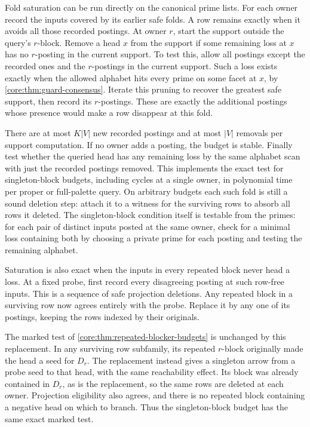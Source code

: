 Fold saturation can be run directly on the canonical
prime lists. For each owner record the inputs covered
by its earlier safe folds. A row remains exactly when
it avoids all those recorded postings. At owner $r$,
start the support outside the query's $r$-block.
Remove a head $x$ from the support if some remaining
loss at $x$ has no $r$-posting in the current support.
To test this, allow all postings except the recorded
ones and the $r$-postings in the current support.
Such a loss exists exactly when the allowed alphabet
hits every prime on some facet at $x$, by
\cref{core:thm:guard-consensus}. Iterate this pruning
to recover the greatest safe support, then record its
$r$-postings. These are exactly the additional postings
whose presence would make a row disappear at this fold.

There are at most $K|V|$ new recorded postings and
at most $|V|$ removals per support computation.
If no owner adds a posting, the budget is stable.
Finally test whether the queried head has any
remaining loss by the same alphabet scan with just
the recorded postings removed. This implements the
exact test for singleton-block budgets, including
cycles at a single owner, in polynomial time per
proper or full-palette query. On arbitrary budgets
each such fold is still a sound deletion step:
attach it to a witness for the surviving rows to
absorb all rows it deleted.
The singleton-block condition itself is testable
from the primes: for each pair of distinct inputs
posted at the same owner, check for a minimal loss
containing both by choosing a private prime for
each posting and testing the remaining alphabet.

Saturation is also exact when the inputs in every
repeated block never head a loss. At a fixed
probe, first record every disagreeing posting
at such row-free inputs. This is a sequence
of safe projection deletions. Any repeated
block in a surviving row now agrees entirely
with the probe. Replace it by any one of
its postings, keeping the rows indexed
by their originals.

The marked test of
\cref{core:thm:repeated-blocker-budgets}
is unchanged by this replacement. In any
surviving row subfamily, its repeated
$r$-block originally made the head a seed
for $D_r$. The replacement instead gives
a singleton arrow from a probe seed to
that head, with the same reachability
effect. Its block was already contained
in $D_r$, as is the replacement, so the
same rows are deleted at each owner.
Projection eligibility also agrees, and
there is no repeated block containing
a negative head on which to branch.
Thus the singleton-block budget has the
same exact marked test.

